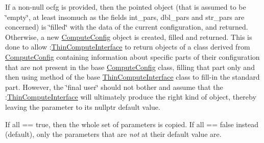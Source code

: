 If a non-\/null ocfg is provided, then the pointed object (that is assumed to be \char`\"{}empty\char`\"{}, at least insomuch as the fields int\+\_\+pars, dbl\+\_\+pars and str\+\_\+pars are concerned) is \char`\"{}filled\char`\"{} with the data of the current configuration, and returned. Otherwise, a new \mbox{\hyperlink{class_s_m_spp__di__unipi__it_1_1_compute_config}{Compute\+Config}} object is created, filled and returned. This is done to allow \+:\mbox{\hyperlink{class_s_m_spp__di__unipi__it_1_1_thin_compute_interface}{Thin\+Compute\+Interface}} to return objects of a class derived from \mbox{\hyperlink{class_s_m_spp__di__unipi__it_1_1_compute_config}{Compute\+Config}} containing information about specific parts of their configuration that are not present in the base \mbox{\hyperlink{class_s_m_spp__di__unipi__it_1_1_compute_config}{Compute\+Config}} class, filling that part only and then using method of the base \mbox{\hyperlink{class_s_m_spp__di__unipi__it_1_1_thin_compute_interface}{Thin\+Compute\+Interface}} class to fill-\/in the standard part. However, the \char`\"{}final user\char`\"{} should not bother and assume that the \+:\mbox{\hyperlink{class_s_m_spp__di__unipi__it_1_1_thin_compute_interface}{Thin\+Compute\+Interface}} will ultimately produce the right kind of object, thereby leaving the parameter to its nullptr default value.

If all == true, then the whole set of parameters is copied. If all == false instead (default), only the parameters that are {\itshape not} at their default value are.


